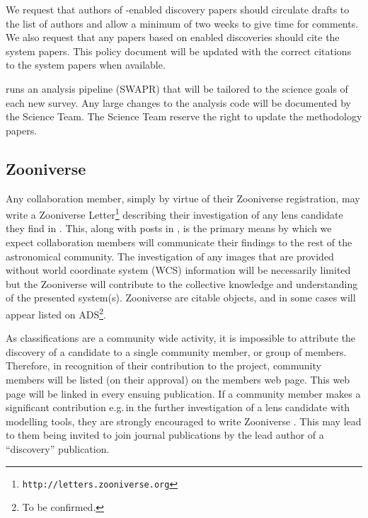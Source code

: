 \documentclass[a4paper,twocolumn]{article}
\begin{document}
We request that authors of \sw-enabled discovery papers should circulate drafts to the list of \sw authors and allow a minimum of two weeks to give time for comments. We also request that any papers based on \sw enabled discoveries should cite the \sw system papers. This policy document will be updated with the correct citations to the \sw system papers when available.

\sw runs an analysis pipeline (SWAPR) that will be tailored to the science goals of each new survey. Any large changes to the analysis code will be documented  by the \sw Science Team. The \sw Science Team reserve the right to update the \sw methodology papers.



\subsection{Zooniverse \Letters}
\label{sec:comm}

Any \sw collaboration member, simply by virtue of their Zooniverse
registration, may write a Zooniverse
Letter\footnote{\texttt{http://letters.zooniverse.org}} describing their
investigation of any lens candidate they find in \sw. This, along with
posts in  \Talk, is the primary means by which we expect collaboration
members will communicate their findings to the rest of the
astronomical community. The investigation of any \sw images that are
provided without world coordinate system (WCS) information will be
necessarily limited but the \sw Zooniverse \Letters will contribute to the collective knowledge and understanding of the presented system(s). Zooniverse \Letters are citable
objects, and in some cases will appear listed on ADS\footnote{To be confirmed.}. 


As \sw classifications are a community wide activity, it is impossible to attribute the discovery of a candidate to a single community member, or group  of members. Therefore, in recognition of their contribution to the \sw project, \sw community members will be listed (on their approval) on the \sw members web page. This web page will be linked in every ensuing \sw publication. If a community member makes a significant contribution e.g.\,in the further investigation of a lens candidate with modelling tools, they are strongly encouraged to write Zooniverse \Letters. This may lead to them being invited to join journal publications by the lead author of a ``discovery'' publication. 

\end{document}
